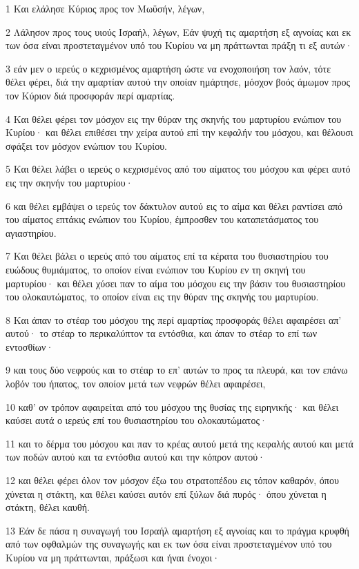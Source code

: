 \par 1 Και ελάλησε Κύριος προς τον Μωϋσήν, λέγων,
\par 2 Λάλησον προς τους υιούς Ισραήλ, λέγων, Εάν ψυχή τις αμαρτήση εξ αγνοίας και εκ των όσα είναι προστεταγμένον υπό του Κυρίου να μη πράττωνται πράξη τι εξ αυτών·
\par 3 εάν μεν ο ιερεύς ο κεχρισμένος αμαρτήση ώστε να ενοχοποιήση τον λαόν, τότε θέλει φέρει, διά την αμαρτίαν αυτού την οποίαν ημάρτησε, μόσχον βοός άμωμον προς τον Κύριον διά προσφοράν περί αμαρτίας.
\par 4 Και θέλει φέρει τον μόσχον εις την θύραν της σκηνής του μαρτυρίου ενώπιον του Κυρίου· και θέλει επιθέσει την χείρα αυτού επί την κεφαλήν του μόσχου, και θέλουσι σφάξει τον μόσχον ενώπιον του Κυρίου.
\par 5 Και θέλει λάβει ο ιερεύς ο κεχρισμένος από του αίματος του μόσχου και φέρει αυτό εις την σκηνήν του μαρτυρίου·
\par 6 και θέλει εμβάψει ο ιερεύς τον δάκτυλον αυτού εις το αίμα και θέλει ραντίσει από του αίματος επτάκις ενώπιον του Κυρίου, έμπροσθεν του καταπετάσματος του αγιαστηρίου.
\par 7 Και θέλει βάλει ο ιερεύς από του αίματος επί τα κέρατα του θυσιαστηρίου του ευώδους θυμιάματος, το οποίον είναι ενώπιον του Κυρίου εν τη σκηνή του μαρτυρίου· και θέλει χύσει παν το αίμα του μόσχου εις την βάσιν του θυσιαστηρίου του ολοκαυτώματος, το οποίον είναι εις την θύραν της σκηνής του μαρτυρίου.
\par 8 Και άπαν το στέαρ του μόσχου της περί αμαρτίας προσφοράς θέλει αφαιρέσει απ' αυτού· το στέαρ το περικαλύπτον τα εντόσθια, και άπαν το στέαρ το επί των εντοσθίων·
\par 9 και τους δύο νεφρούς και το στέαρ το επ' αυτών το προς τα πλευρά, και τον επάνω λοβόν του ήπατος, τον οποίον μετά των νεφρών θέλει αφαιρέσει,
\par 10 καθ' ον τρόπον αφαιρείται από του μόσχου της θυσίας της ειρηνικής· και θέλει καύσει αυτά ο ιερεύς επί του θυσιαστηρίου του ολοκαυτώματος·
\par 11 και το δέρμα του μόσχου και παν το κρέας αυτού μετά της κεφαλής αυτού και μετά των ποδών αυτού και τα εντόσθια αυτού και την κόπρον αυτού·
\par 12 και θέλει φέρει όλον τον μόσχον έξω του στρατοπέδου εις τόπον καθαρόν, όπου χύνεται η στάκτη, και θέλει καύσει αυτόν επί ξύλων διά πυρός· όπου χύνεται η στάκτη, θέλει καυθή.
\par 13 Εάν δε πάσα η συναγωγή του Ισραήλ αμαρτήση εξ αγνοίας και το πράγμα κρυφθή από των οφθαλμών της συναγωγής και εκ των όσα είναι προστεταγμένον υπό του Κυρίου να μη πράττωνται, πράξωσι και ήναι ένοχοι·
